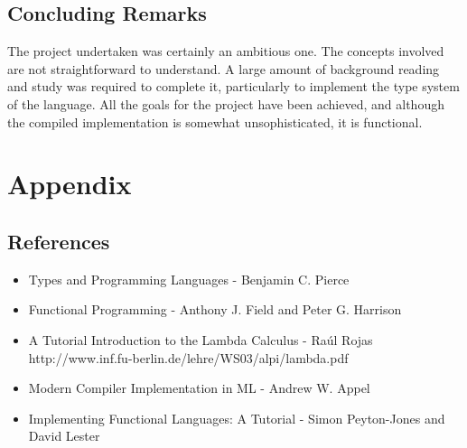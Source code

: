 \documentclass{article}
\begin{document}
\subsection{Concluding Remarks}
The project undertaken was certainly an ambitious one. The concepts involved are not straightforward to understand. A large amount of background reading and study was required to complete it, particularly to implement the type system of the language. All the goals for the project have been achieved, and although the compiled implementation is somewhat unsophisticated, it is functional.

\pagebreak
\section{Appendix}
\subsection{References}
\begin{itemize}
    \item Types and Programming Languages - Benjamin C. Pierce
    \item Functional Programming - Anthony J. Field and Peter G. Harrison
    \item A Tutorial Introduction to the Lambda Calculus - Ra\'{u}l Rojas \\
        http://www.inf.fu-berlin.de/lehre/WS03/alpi/lambda.pdf
    \item Modern Compiler Implementation in ML - Andrew W. Appel
    \item Implementing Functional Languages: A Tutorial - Simon Peyton-Jones and David Lester
\end{itemize}
\end{document}
